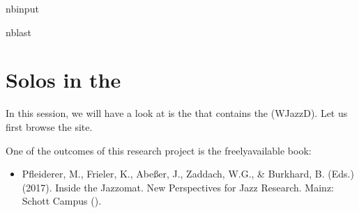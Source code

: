 \documentclass[letterpaper,10pt,english]{sphinxmanual}
\begin{document}
\begin{sphinxuseclass}{nbinput}
\begin{sphinxuseclass}{nblast}
{
\begin{sphinxVerbatim}[commandchars=\\\{\}]
\llap{\color{nbsphinxin}[ ]:\,\hspace{\fboxrule}\hspace{\fboxsep}}
\end{sphinxVerbatim}
}

\end{sphinxuseclass}
\end{sphinxuseclass}

\chapter{Solos in the }
\label{\detokenize{04_jazz_solos:Solos-in-the-Weimar-Jazz-Database}}\label{\detokenize{04_jazz_solos::doc}}
\sphinxAtStartPar
{}

\sphinxAtStartPar
In this session, we will have a look at is the  that contains the  (WJazzD). Let us first browse the site.

\sphinxAtStartPar
One of the outcomes of this research project is the freely\sphinxhyphen{}available book:
\begin{itemize}
\item {} 
\sphinxAtStartPar
Pfleiderer, M., Frieler, K., Abeßer, J., Zaddach, W.\sphinxhyphen{}G., \& Burkhard, B. (Eds.) (2017). Inside the Jazzomat. New Perspectives for Jazz Research. Mainz: Schott Campus ().

\end{itemize}
\end{document}
